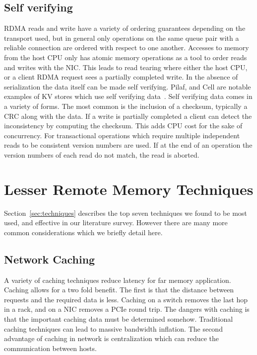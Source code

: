\subsection{Self verifying} RDMA reads and write have a variety of ordering
guarantees depending on the transport used, but in general only operations on
the same queue pair with a reliable connection are ordered with respect to one
another. Accesses to memory from the host CPU only has atomic memory operations
as a tool to order reads and writes with the NIC. This leads to read tearing
where either the host CPU, or a client RDMA request sees a partially completed
write. In the absence of serialization the data itself can be made self
verifying.  Pilaf, and Cell are notable examples of KV stores which use self
verifying data~\cite{pilaf,cell}. Self verifying data comes in a variety of
forms. The most common is the inclusion of a checksum, typically a CRC along
with the data. If a write is partially completed a client can detect the
inconsistency by computing the checksum. This adds CPU cost for the sake of
concurrency. For transactional operations which require multiple independent reads
to be consistent version numbers are used. If at the end of an operation the
version numbers of each read do not match, the read is aborted.


\section{Lesser Remote Memory Techniques}
\label{sec:additional}

Section~\ref{sec:techniques} describes the top seven techniques we found to be
most used, and effective in our literature survey. However there are many more
common considerations which we briefly detail here.

\subsection{Network Caching} A variety of caching techniques reduce latency for far memory
application. Caching allows for a two fold benefit. The first is that the
distance between requests and the required data is less. Caching on a switch
removes the last hop in a rack, and on a NIC removes a PCIe round trip. The
dangers with caching is that the important caching data must be determined
somehow. Traditional caching techniques can lead to massive bandwidth inflation.
The second advantage of caching in network is centralization which can reduce
the communication between hosts.

